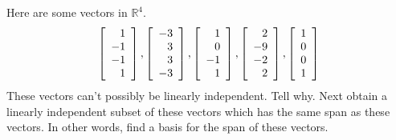 \begin{enumialphparenastyle}
\begin{ex} Here are some vectors in $\mathbb{R}^{4}$. 
\begin{equation*}
\left[ 
\begin{array}{r}
1 \\ 
-1 \\ 
-1 \\ 
1
\end{array}
\right] ,\left[ 
\begin{array}{r}
-3 \\ 
3 \\ 
3 \\ 
-3
\end{array}
\right] ,\left[ 
\begin{array}{r}
1 \\ 
0 \\ 
-1 \\ 
1
\end{array}
\right] ,\left[ 
\begin{array}{r}
2 \\ 
-9 \\ 
-2 \\ 
2
\end{array}
\right] ,\left[ 
\begin{array}{r}
1 \\ 
0 \\ 
0 \\ 
1
\end{array}
\right] 
\end{equation*}
These vectors can't possibly be linearly independent. Tell why. Next obtain a
linearly independent subset of these vectors which has the same span as
these vectors. In other words, find a basis for the span of these vectors.
\end{ex}


\end{enumialphparenastyle}
